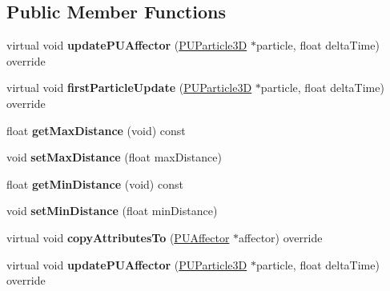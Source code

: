 \subsection*{Public Member Functions}
\begin{DoxyCompactItemize}
\item 
\mbox{\label{classPUParticleFollower_a17d70fed9820e7a5f8fb02ebfc4bbe9f}} 
virtual void {\bfseries update\+P\+U\+Affector} (\hyperlink{structPUParticle3D}{P\+U\+Particle3D} $\ast$particle, float delta\+Time) override
\item 
\mbox{\label{classPUParticleFollower_a630ce4407f1b37e821bc2e901c95b297}} 
virtual void {\bfseries first\+Particle\+Update} (\hyperlink{structPUParticle3D}{P\+U\+Particle3D} $\ast$particle, float delta\+Time) override
\item 
\mbox{\label{classPUParticleFollower_a1c626f1e8ec504b731e0e9e3cea67840}} 
float {\bfseries get\+Max\+Distance} (void) const
\item 
\mbox{\label{classPUParticleFollower_a9f84e902ddc93bbd9a6f0102406966f3}} 
void {\bfseries set\+Max\+Distance} (float max\+Distance)
\item 
\mbox{\label{classPUParticleFollower_aa1965b2589f22f8de8a2839754257aa6}} 
float {\bfseries get\+Min\+Distance} (void) const
\item 
\mbox{\label{classPUParticleFollower_a1bab19e72e519e0330c241fb5e00fa43}} 
void {\bfseries set\+Min\+Distance} (float min\+Distance)
\item 
\mbox{\label{classPUParticleFollower_a9d6f8c82ca0f51ea2e85caea06c97eee}} 
virtual void {\bfseries copy\+Attributes\+To} (\hyperlink{classPUAffector}{P\+U\+Affector} $\ast$affector) override
\item 
\mbox{\label{classPUParticleFollower_a4dd266cbeca8ecba38488c5582f40ccb}} 
virtual void {\bfseries update\+P\+U\+Affector} (\hyperlink{structPUParticle3D}{P\+U\+Particle3D} $\ast$particle, float delta\+Time) override
\item 

\end{DoxyCompactItemize}
